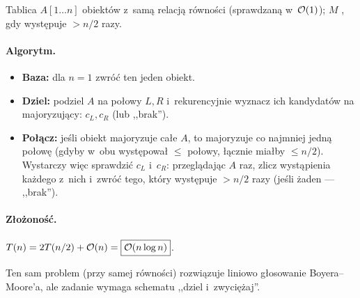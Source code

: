 Tablica $A[1\ldots n]$ obiektów z~samą relacją równości (sprawdzaną w~$\mathcal{O}(1)$);
$M$ , gdy występuje $>n/2$ razy.

\paragraph{Algorytm.}
\begin{itemize}[nosep]
	\item \textbf{Baza:} dla $n=1$ zwróć ten jeden obiekt.
	\item \textbf{Dziel:} podziel $A$ na połowy $L,R$ i~rekurencyjnie wyznacz ich
	      kandydatów na majoryzujący: $c_L,c_R$ (lub ,,brak'').
	\item \textbf{Połącz:} jeśli obiekt majoryzuje całe $A$, to majoryzuje co
	      najmniej jedną połowę (gdyby w~obu występował $\leq$ połowy, łącznie
	      miałby $\leq n/2$). Wystarczy więc sprawdzić $c_L$ i~$c_R$: przeglądając
	      $A$ raz, zlicz wystąpienia każdego z~nich i~zwróć tego, który występuje
	      $>n/2$ razy (jeśli żaden --- ,,brak'').
\end{itemize}

\paragraph{Złożoność.}
$T(n)=2T(n/2)+\mathcal{O}(n)=\boxed{\mathcal{O}(n\log n)}$.
\begin{remark}
	Ten sam problem (przy samej równości) rozwiązuje liniowo głosowanie
	Boyera--Moore'a, ale zadanie wymaga schematu ,,dziel i~zwyciężaj''.
\end{remark}
